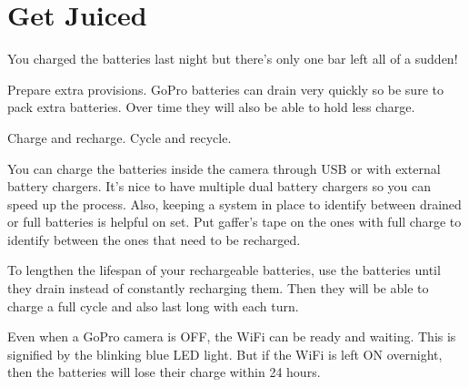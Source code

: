 \section{Get Juiced}
\pagecolor{white}
\label{chap:7}
\begin{fullwidth}

\problem

{\large You charged the batteries last night but there’s only one bar left all of a sudden! \par}

Prepare extra provisions. GoPro batteries can drain very quickly so be sure to pack extra batteries. Over time they will also be able to hold less charge. 


\solution

{\large Charge and recharge. Cycle and recycle. \par}

You can charge the batteries inside the camera through USB or with external battery chargers. It’s nice to have multiple dual battery chargers so you can speed up the process. Also, keeping a system in place to identify between drained or full batteries is helpful on set. Put gaffer’s tape on the ones with full charge to identify between the ones that need to be recharged. 

To lengthen the lifespan of your rechargeable batteries, use the batteries until they drain instead of constantly recharging them. Then they will be able to charge a full cycle and also last long with each turn. 

\tip Even when a GoPro camera is OFF, the WiFi can be ready and waiting. This is signified by the blinking blue LED light. But if the WiFi is left ON overnight, then the batteries will lose their charge within 24 hours.




\clearpage
\end{fullwidth}
